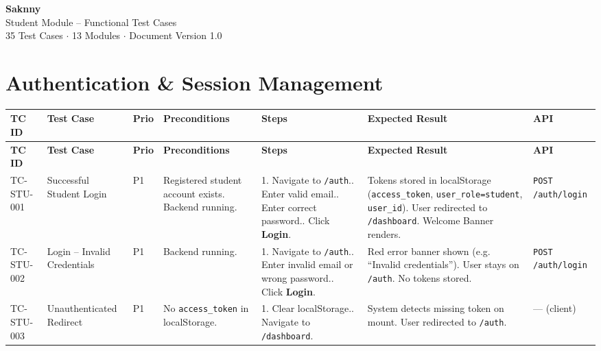 \documentclass[12pt,a4paper]{article}
\begin{document}
\begin{titlepage}
    \centering
    \vspace*{4cm}
    {\Huge\bfseries\textcolor{saknnyprimary}{Saknny}}\\[0.5cm]
    {\Large\textcolor{saknnyaccent}{Student Module -- Functional Test Cases}}\\[1.5cm]
    \vfill
    {\small 35 Test Cases $\cdot$ 13 Modules $\cdot$ Document Version 1.0}
\end{titlepage}

\tableofcontents
\newpage


\section{Authentication \& Session Management}

\begin{longtable}{L{2cm} L{3cm} L{1cm} L{4cm} L{5.5cm} L{5.5cm} L{3cm}}
\toprule
\textbf{TC ID} & \textbf{Test Case} & \textbf{Prio} & \textbf{Preconditions} & \textbf{Steps} & \textbf{Expected Result} & \textbf{API} \\
\midrule
\endfirsthead
\toprule
\textbf{TC ID} & \textbf{Test Case} & \textbf{Prio} & \textbf{Preconditions} & \textbf{Steps} & \textbf{Expected Result} & \textbf{API} \\
\midrule
\endhead
\bottomrule
\endfoot

TC-STU-001
& Successful Student Login
& P1
& Registered student account exists. Backend running.
& 1. Navigate to \texttt{/auth}.. Enter valid email.. Enter correct password.. Click \textbf{Login}.
& Tokens stored in localStorage (\texttt{access\_token}, \texttt{user\_role=student}, \texttt{user\_id}). User redirected to \texttt{/dashboard}. Welcome Banner renders.
& \texttt{POST /auth/login}
\\
\midrule

TC-STU-002
& Login -- Invalid Credentials
& P1
& Backend running.
& 1. Navigate to \texttt{/auth}.. Enter invalid email or wrong password.. Click \textbf{Login}.
& Red error banner shown (e.g. ``Invalid credentials''). User stays on \texttt{/auth}. No tokens stored.
& \texttt{POST /auth/login}
\\
\midrule

TC-STU-003
& Unauthenticated Redirect
& P1
& No \texttt{access\_token} in localStorage.
& 1. Clear localStorage.. Navigate to \texttt{/dashboard}.
& System detects missing token on mount. User redirected to \texttt{/auth}.
& --- (client)
\\

\end{longtable}
\end{document}
